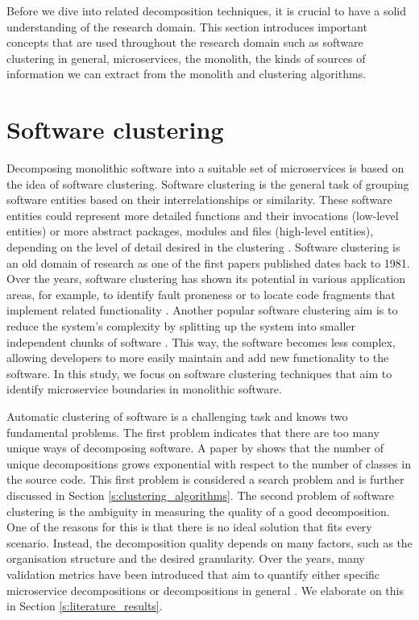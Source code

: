 Before we dive into related decomposition techniques, it is crucial to have a solid understanding of the research domain. This section introduces important concepts that are used throughout the research domain such as software clustering in general, microservices, the monolith, the kinds of sources of information we can extract from the monolith and clustering algorithms.

\section{Software clustering}\label{s:software_clustering}
Decomposing monolithic software into a suitable set of microservices is based on the idea of software clustering. Software clustering is the general task of grouping software entities based on their interrelationships or similarity. These software entities could represent more detailed functions and their invocations (low-level entities) or more abstract packages, modules and files (high-level entities), depending on the level of detail desired in the clustering \cite{alsarhan2020software}. Software clustering is an old domain of research as one of the first papers published \cite{belady1981system} dates back to 1981. Over the years, software clustering has shown its potential in various application areas, for example, to identify fault proneness or to locate code fragments that implement related functionality \cite{alsarhan2020software}. Another popular software clustering aim is to reduce the system's complexity by splitting up the system into smaller independent chunks of software \cite{wiggerts1997using}. This way, the software becomes less complex, allowing developers to more easily maintain and add new functionality to the software. In this study, we focus on software clustering techniques that aim to identify microservice boundaries in monolithic software.\par
Automatic clustering of software is a challenging task and knows two fundamental problems. The first problem indicates that there are too many unique ways of decomposing software. A paper by \citeauthor{mancoridis1998using} \cite{mancoridis1998using} shows that the number of unique decompositions grows exponential with respect to the number of classes in the source code. This first problem is considered a search problem and is further discussed in Section \ref{s:clustering_algorithms}. The second problem of software clustering is the ambiguity in measuring the quality of a good decomposition. One of the reasons for this is that there is no ideal solution that fits every scenario. Instead, the decomposition quality depends on many factors, such as the organisation structure and the desired granularity. Over the years, many validation metrics have been introduced that aim to quantify either specific microservice decompositions \cite{jin2018functionality} or decompositions in general \cite{mitchell2001craft}. We elaborate on this in Section \ref{s:literature_results}. \par

